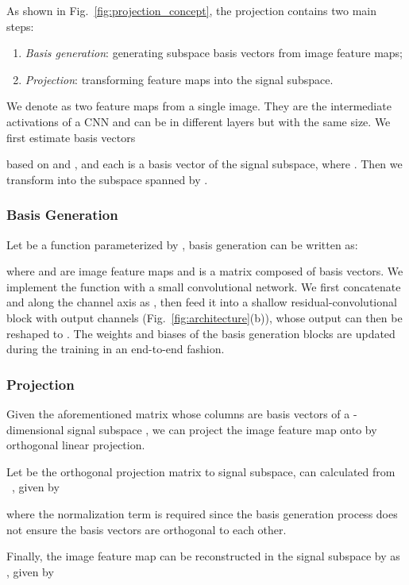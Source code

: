 \documentclass[final]{cvpr}
\begin{document}
As shown in Fig.~\ref{fig:projection_concept}, the projection contains two main steps:
\begin{enumerate}[label=\alph*),topsep=0pt, partopsep=0pt,itemsep=0pt,parsep=0pt]
	\item \emph{Basis generation}: generating subspace basis vectors from image feature maps;
	\item \emph{Projection}: transforming feature maps into the signal subspace.
\end{enumerate}

We denote   as two feature maps from a single image. 
They are the intermediate activations of a CNN and can be in different layers but with the same size.
We first estimate  basis vectors

based on  and , and each  is a basis vector of the signal subspace, where . 
Then we transform  into the subspace spanned by .


\subsubsection{Basis Generation}
Let  be a function parameterized by , basis generation can be written as:

where   and  are image feature maps and  is a matrix
composed of basis vectors. 
We implement the function  with a small convolutional network. We first concatenate  and 
along the channel axis as , then feed it into a shallow residual-convolutional block with  output channels (Fig.~\ref{fig:architecture}(b)), whose output can then be reshaped to . The weights and biases of the basis generation blocks are updated during the training in an end-to-end fashion.





\subsubsection{Projection}
Given the aforementioned matrix  whose columns are basis vectors of a 
-dimensional signal subspace , 
we can project the image feature map  onto  by orthogonal linear projection. 

Let  be the orthogonal projection matrix to signal subspace,  can calculated from ~\cite{meyer2000}, given by

where the normalization term  is required since the basis generation
process does not ensure the basis vectors are orthogonal to each other.

Finally, the image feature map  can be reconstructed in the signal subspace by as , given
by
\end{document}

